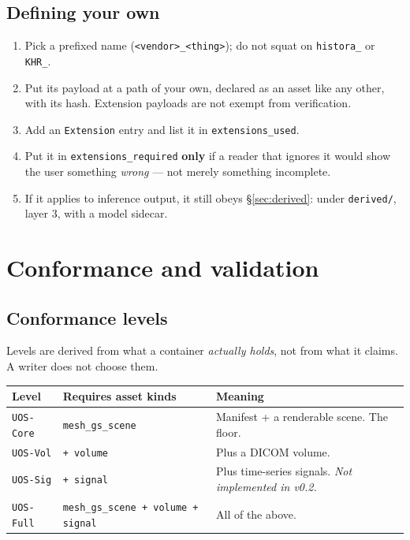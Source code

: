 \documentclass[11pt,a4paper]{article}
\newcommand{\code}[1]{\texttt{\small #1}}
\begin{document}
\subsection{Defining your own}

\begin{enumerate}
  \item Pick a prefixed name (\code{<vendor>\_<thing>}); do not squat on \code{histora\_} or
  \code{KHR\_}.
  \item Put its payload at a path of your own, declared as an asset like any other, with
  its hash. Extension payloads are not exempt from verification.
  \item Add an \code{Extension} entry and list it in \code{extensions\_used}.
  \item Put it in \code{extensions\_required} \textbf{only} if a reader that ignores it
  would show the user something \emph{wrong} --- not merely something incomplete.
  \item If it applies to inference output, it still obeys \S\ref{sec:derived}: under
  \code{derived/}, layer 3, with a model sidecar.
\end{enumerate}

\section{Conformance and validation}\label{sec:conformance}

\subsection{Conformance levels}

Levels are derived from what a container \emph{actually holds}, not from what it claims. A
writer does not choose them.

\begin{longtable}{L{2.8cm} L{4.4cm} L{7.8cm}}
\toprule
\textbf{Level} & \textbf{Requires asset kinds} & \textbf{Meaning}\\
\midrule
\endhead
\code{UOS-Core} & \code{mesh\_gs\_scene} & Manifest + a renderable scene. The floor.\\
\code{UOS-Vol} & \code{+ volume} & Plus a DICOM volume.\\
\code{UOS-Sig} & \code{+ signal} & Plus time-series signals. \emph{Not implemented in
v0.2.}\\
\code{UOS-Full} & \code{mesh\_gs\_scene + volume + signal} & All of the above.\\
\bottomrule
\end{longtable}
\end{document}
